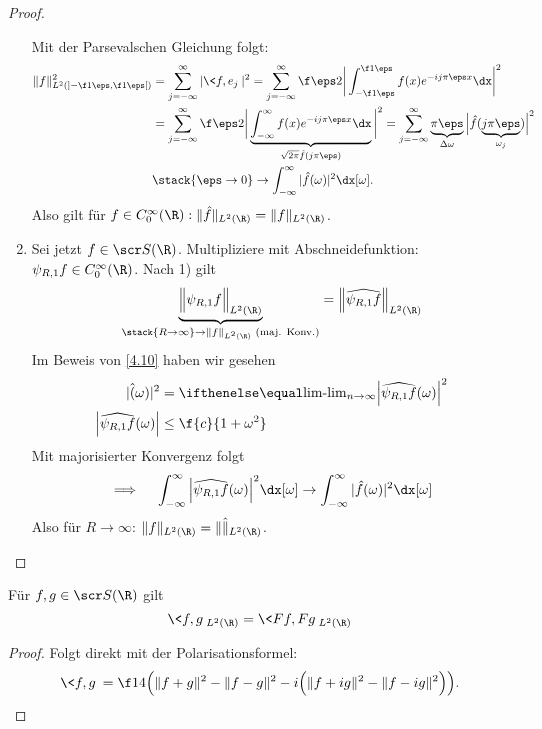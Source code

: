 \begin{st}
\begin{proof}
\begin{enumerate}[1)]
				Mit der Parsevalschen Gleichung folgt:
				\begin{align*}
					\|f\|_{L^2(]-\f 1\eps, \f 1\eps[)}^2 
					&= \sum_{j=-\infty}^\infty |\<f,e_j\>|^2 
					= \sum_{j=-\infty}^\infty \f \eps 2 \bigg| \int_{-\f 1\eps}^{\f 1\eps} f(x) e^{-ij\pi \eps x} \dx \bigg|^2 \\
					&= \sum_{j=-\infty}^\infty \f \eps 2 \bigg| \underbrace{\int_{-\infty}^{\infty} f(x) e^{-ij\pi \eps x} \dx}_{\sqrt{2\pi} \hat f (j\pi \eps)} \bigg|^2 
					= \sum_{j=-\infty}^\infty \underbrace{\pi \eps}_{\Delta \omega} \Big| \hat f(\underbrace{j\pi \eps}_{\omega_j})\Big|^2 \\
					&\stack{\eps \to 0}\to \int_{-\infty}^\infty |\hat f(\omega)|^2 \dx[\omega].
				\end{align*}
				Also gilt für $f \in C_0^\infty(\R) : \|\hat f\|_{L^2(\R)} = \|f\|_{L^2(\R)}$.
			\item
				Sei jetzt $f \in \scr S(\R)$.
				Multipliziere mit Abschneidefunktion: $\psi_{R,1} f \in C_0^\infty(\R)$.
				Nach 1) gilt
				\[
					\underbrace{\Big\|\psi_{R,1} f\Big\|_{L^2(\R)}}_{\stack{R\to \infty}\to \|f\|_{L^2(\R)} \text{ (maj. Konv.)}} = \Big\| \widehat{\psi_{R,1} f} \Big\|_{L^2(\R)}
				\]
				Im Beweis von \ref{4.10} haben wir gesehen
				\begin{align*}
					|\hat(\omega)|^2 &= \lim_{n\to\infty}\Big| \widehat{\psi_{R,1}f}(\omega) \Big|^2 \\
					\Big| \widehat{\psi_{R,1} f}(\omega) \Big| &\le \f {c}{1+\omega^2}
				\end{align*}
				Mit majorisierter Konvergenz folgt
				\[
					\implies \quad \int_{-\infty}^\infty \Big| \widehat{\psi_{R,1}f}(\omega)\Big|^2 \dx[\omega] \to \int_{-\infty}^\infty |\hat f(\omega)|^2 \dx[\omega]
				\]
				Also für $R \to \infty$: $\|f\|_{L^2(\R)} = \|\hat \|_{L^2(\R)}$.
		\end{enumerate}
	\end{proof}
\end{st}

\begin{kor} \label{4.16}
	Für $f,g \in \scr S(\R)$ gilt
	\[
		\<f,g\>_{L^2(\R)} = \< Ff, Fg\>_{L^2(\R)}
	\]
	\begin{proof}
		Folgt direkt mit der Polarisationsformel:
		\[
			\<f,g\> = \f 14 \Big( \|f+g\|^2 - \|f-g\|^2 - i \Big(\|f+ig\|^2 - \|f-ig\|^2 \Big) \Big).
		\]
	\end{proof}
\end{kor}

